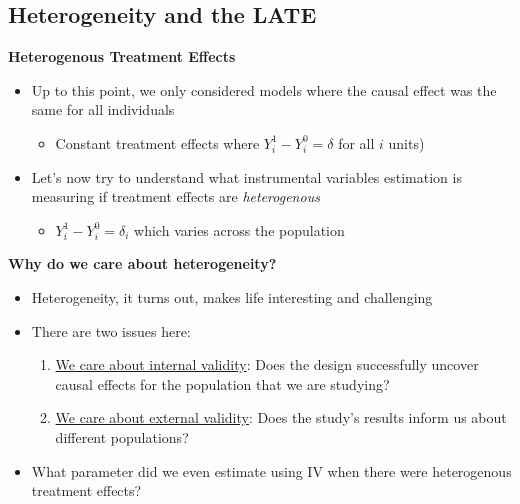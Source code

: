 \documentclass[notes=show]{beamer}
\begin{document}
\subsection{Heterogeneity and the LATE}


\begin{frame}

	\begin{center}
	\textbf{Heterogenous Treatment Effects}
	\end{center}

	\begin{itemize}
	\item Up to this point, we only considered models where the causal effect was the same for all individuals 
		\begin{itemize}
		\item Constant treatment effects where $Y_{i}^1 - Y_i^0=\delta$ for all $i$ units)
		\end{itemize}
	\item Let's now try to understand what instrumental variables estimation is measuring if treatment effects are \emph{heterogenous} 
		\begin{itemize}
		\item $Y_i^1 - Y_i^0=\delta_i$ which varies across the population
		\end{itemize}
	\end{itemize}

\end{frame}

\begin{frame}[plain]
\begin{center}
\textbf{Why do we care about heterogeneity?}
\end{center}

\begin{itemize}
\item Heterogeneity, it turns out, makes life interesting and challenging
\item There are two issues here:
		\begin{enumerate}
		\item \underline{We care about internal validity}:  Does the design successfully uncover causal effects for the population that we are studying?
		\item \underline{We care about external validity}: Does the study's results inform us about different populations?
		\end{enumerate}
\item What parameter did we even estimate using IV when there were heterogenous treatment effects?
\end{itemize}

\end{frame}
\end{document}
